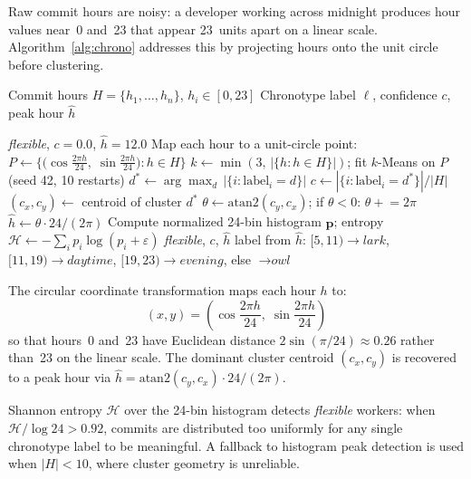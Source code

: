 \documentclass[conference]{IEEEtran}
\begin{document}
Raw commit hours are noisy: a developer working across midnight
produces hour values near~0 and~23 that appear 23~units apart on a
linear scale.  Algorithm~\ref{alg:chrono} addresses this by
projecting hours onto the unit circle before clustering.

\begin{algorithm}[t]
\caption{Circular K-Means Chronotype Classification}
\label{alg:chrono}
\begin{algorithmic}[1]
\REQUIRE Commit hours $H = \{h_1, \ldots, h_n\}$, $h_i \in [0,23]$
\ENSURE Chronotype label $\ell$, confidence $c$, peak hour $\hat{h}$

  \RETURN \textit{flexible}, $c{=}0.0$, $\hat{h}{=}12.0$
\ENDIF
\STATE Map each hour to a unit-circle point:
  $P \leftarrow \bigl\{\bigl(\cos\tfrac{2\pi h}{24},\;
    \sin\tfrac{2\pi h}{24}\bigr) : h \in H\bigr\}$
\STATE $k \leftarrow \min(3,\, |\{h : h \in H\}|)$;
  fit $k$-Means on $P$ (seed 42, 10 restarts)
\STATE $d^* \leftarrow \arg\max_d \,|\{i : \text{label}_i = d\}|$
\STATE $c \leftarrow |\{i : \text{label}_i = d^*\}| / |H|$
\STATE $(c_x, c_y) \leftarrow$ centroid of cluster $d^*$
\STATE $\theta \leftarrow \mathrm{atan2}(c_y, c_x)$;\;
  if $\theta < 0$: $\theta \mathrel{+}= 2\pi$
\STATE $\hat{h} \leftarrow \theta \cdot 24 / (2\pi)$
\STATE Compute normalized 24-bin histogram $\mathbf{p}$;
  entropy $\mathcal{H} \leftarrow -\sum_{i} p_i \log(p_i + \varepsilon)$
  \RETURN \textit{flexible}, $c$, $\hat{h}$
\ENDIF
\RETURN label from $\hat{h}$:
  $[5,11) \to \textit{lark}$,\;
  $[11,19) \to \textit{daytime}$,\;
  $[19,23) \to \textit{evening}$,\;
  else $\to \textit{owl}$
\end{algorithmic}
\end{algorithm}

The circular coordinate transformation maps each hour $h$ to:
\begin{equation}
  (x, y) = \left(\cos\!\frac{2\pi h}{24},\; \sin\!\frac{2\pi h}{24}\right)
  \label{eq:circ}
\end{equation}
so that hours~0 and~23 have Euclidean distance
$2\sin(\pi/24) \approx 0.26$ rather than~23 on the linear scale.
The dominant cluster centroid $(c_x, c_y)$ is recovered to a peak
hour via $\hat{h} = \mathrm{atan2}(c_y, c_x) \cdot 24 / (2\pi)$.

Shannon entropy $\mathcal{H}$ over the 24-bin histogram detects
\textit{flexible} workers: when $\mathcal{H}/\log 24 > 0.92$,
commits are distributed too uniformly for any single chronotype
label to be meaningful.  A fallback to histogram peak detection
is used when $|H| < 10$, where cluster geometry is unreliable.
\end{document}
